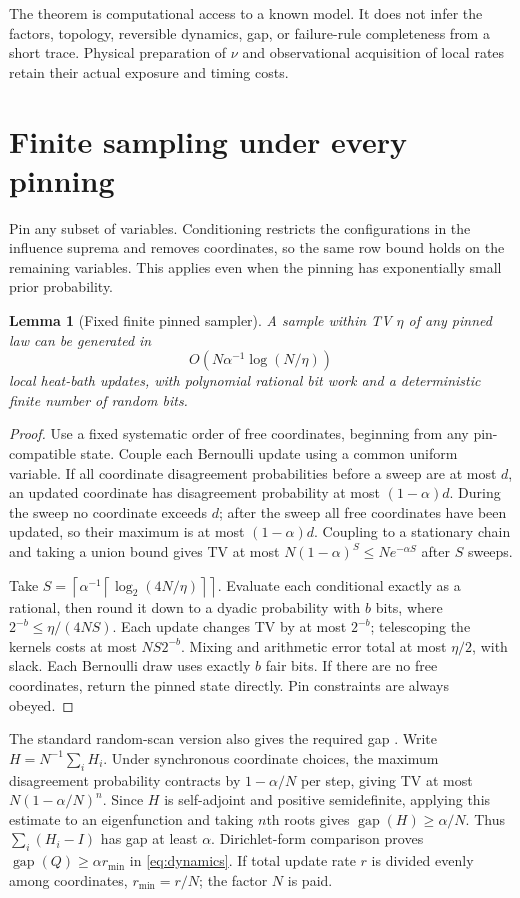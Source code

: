 \documentclass[11pt]{article}
\newtheorem{lemma}[theorem]{Lemma}
\newcommand{\ceil}[1]{\left\lceil #1\right\rceil}
\begin{document}
The theorem is computational access to a known model. It does not infer the factors, topology, reversible dynamics, gap, or failure-rule completeness from a short trace. Physical preparation of $\nu$ and observational acquisition of local rates retain their actual exposure and timing costs.

\section{Finite sampling under every pinning}
\label{sec:mix}
Pin any subset of variables. Conditioning restricts the configurations in the influence suprema and removes coordinates, so the same row bound holds on the remaining variables. This applies even when the pinning has exponentially small prior probability.

\begin{lemma}[Fixed finite pinned sampler]
A sample within TV $\eta$ of any pinned law can be generated in
\[
 O\left(N\alpha^{-1}\log(N/\eta)\right)
\]
local heat-bath updates, with polynomial rational bit work and a deterministic finite number of random bits.
\end{lemma}
\begin{proof}
Use a fixed systematic order of free coordinates, beginning from any pin-compatible state. Couple each Bernoulli update using a common uniform variable. If all coordinate disagreement probabilities before a sweep are at most $d$, an updated coordinate has disagreement probability at most $(1-\alpha)d$. During the sweep no coordinate exceeds $d$; after the sweep all free coordinates have been updated, so their maximum is at most $(1-\alpha)d$. Coupling to a stationary chain and taking a union bound gives TV at most $N(1-\alpha)^S\le Ne^{-\alpha S}$ after $S$ sweeps.

Take $S=\ceil{\alpha^{-1}\ceil{\log_2(4N/\eta)}}$. Evaluate each conditional exactly as a rational, then round it down to a dyadic probability with $b$ bits, where $2^{-b}\le\eta/(4NS)$. Each update changes TV by at most $2^{-b}$; telescoping the kernels costs at most $NS2^{-b}$. Mixing and arithmetic error total at most $\eta/2$, with slack. Each Bernoulli draw uses exactly $b$ fair bits. If there are no free coordinates, return the pinned state directly. Pin constraints are always obeyed.
\end{proof}

The standard random-scan version also gives the required gap \cite{hayes}. Write $H=N^{-1}\sum_iH_i$. Under synchronous coordinate choices, the maximum disagreement probability contracts by $1-\alpha/N$ per step, giving TV at most $N(1-\alpha/N)^n$. Since $H$ is self-adjoint and positive semidefinite, applying this estimate to an eigenfunction and taking $n$th roots gives $\operatorname{gap}(H)\ge\alpha/N$. Thus $\sum_i(H_i-I)$ has gap at least $\alpha$. Dirichlet-form comparison proves $\operatorname{gap}(Q)\ge\alpha r_{\min}$ in \eqref{eq:dynamics}. If total update rate $r$ is divided evenly among coordinates, $r_{\min}=r/N$; the factor $N$ is paid.
\end{document}
